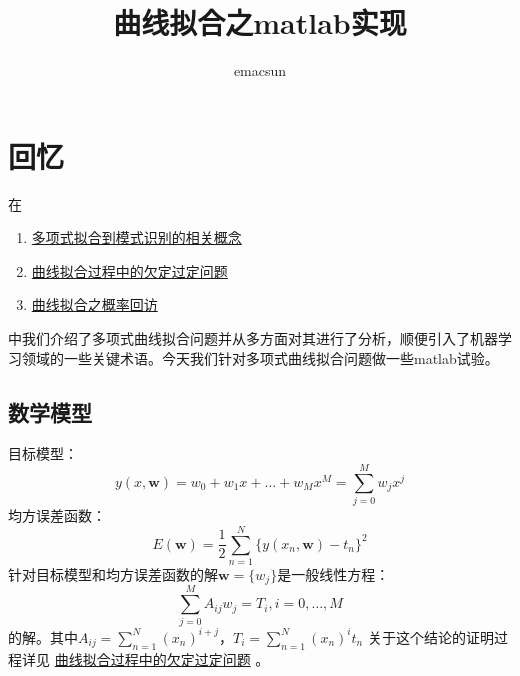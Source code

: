 \documentclass[10pt,a4paper,UTF8]{article}
\author{emacsun}
\date{}
\title{曲线拟合之matlab实现}
\begin{document}
\maketitle
\tableofcontents
{}

\section{回忆}
\label{sec:org5ef0dd1}


在
\begin{enumerate}
\item \href{./PRMLch1dot1-polynomial-curve.org}{多项式拟合到模式识别的相关概念}
\item \href{./PRMLch1dot1-polynomial-curve-appendix.org}{曲线拟合过程中的欠定过定问题}
\item \href{./PRMLch1dot1-polynomial-curve-probability-revist.org}{曲线拟合之概率回访}
\end{enumerate}

中我们介绍了多项式曲线拟合问题并从多方面对其进行了分析，顺便引入了机器学习领域的一些关键术语。今天我们针对多项式曲线拟合问题做一些matlab试验。
\subsection{数学模型}
\label{sec:org4539d06}


目标模型：
\begin{equation}
\label{eq:2}
y(x, \mathbf{w}) = w_{0} + w_{1}x + \ldots + w_{M}x^{M} = \sum_{j=0}^{M}w_{j}x^{j}
\end{equation}
均方误差函数：
\begin{equation}
\label{eq:3}
E( \mathbf{w}) = \frac{1}{2} \sum_{n=1}^{N}\{y(x_{n}, \mathbf{w}) - t_{n}\}^{2}
\end{equation}
针对目标模型和均方误差函数的解\(\mathbf{w} = \{w_{j}\}\)是一般线性方程：
\begin{equation}
\label{eq:4}
\sum_{j=0}^{M}A_{ij}w_{j} = T_{i}, i = 0,\ldots ,M
\end{equation}
的解。其中\(A_{ij} = \sum_{n=1}^{N}(x_{n})^{i+j}\)，\(T_{i} = \sum_{n=1}^{N}(x_{n})^{i}t_{n}\) 关于这个结论的证明过程详见 \href{./PRMLch1dot1-polynomial-curve-appendix.org}{曲线拟合过程中的欠定过定问题} 。
\end{document}
